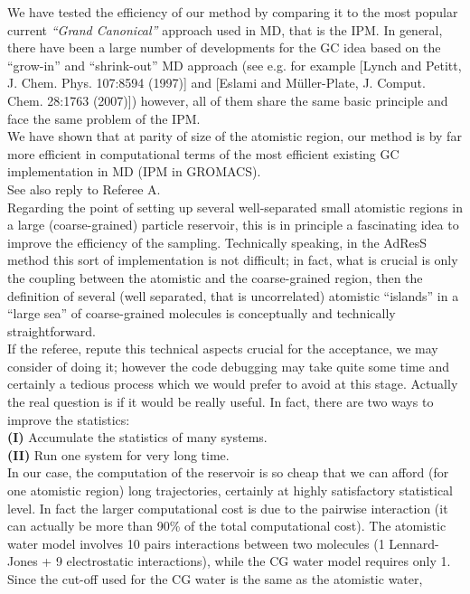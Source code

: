 \documentclass[12pt,a4paper]{article}
\begin{document}
We have tested the efficiency of our method by comparing it to the most popular current {\it ``Grand Canonical''} approach used in MD, that is the {IPM}.
In general, there have been a large number of developments for the GC idea based on the ``grow-in'' and ``shrink-out'' MD approach (see e.g. for example [Lynch and Petitt, J. Chem. Phys. 107:8594 (1997)] and [Eslami and M\"uller-Plate,
  J. Comput. Chem. 28:1763 (2007)]) however, all of them  share the same basic principle and face the same problem
  of the IPM.
\\
We have shown that at parity of size of the atomistic region, our method is by far more efficient in computational terms of the most efficient existing GC implementation in MD (IPM in GROMACS).\\
See also reply to Referee A.\\
Regarding the point of setting up several  well-separated small atomistic regions in a large (coarse-grained) particle reservoir, this is in principle
  a fascinating idea to improve the efficiency of the sampling. Technically speaking, in the AdResS method this sort of implementation is not difficult;
in fact, what is crucial is only the coupling between the atomistic and the coarse-grained region, then the definition of several (well separated, that is uncorrelated)
atomistic ``islands'' in a ``large sea'' of coarse-grained molecules is conceptually and technically straightforward.\\
If the referee, repute this technical aspects crucial for the acceptance, we may consider of doing it; however the code debugging may take quite some time and certainly a tedious process which we would prefer to avoid at this stage.
Actually the real question is if it would be really useful.
In fact, there are two ways to improve the statistics:\\
{\bf (I)} Accumulate the statistics of many systems.\\
{\bf (II)} Run one system for very long time.\\
In our case, the computation of the reservoir is so cheap that we can afford (for one atomistic region) long trajectories, certainly at highly satisfactory statistical level. In fact the
  larger computational cost is due to the pairwise interaction (it can actually be more than 90\% of the total computational cost).
  The atomistic water model involves 10 pairs interactions between two molecules (1 Lennard-Jones + 9 electrostatic interactions),
  while the CG water model requires only 1. Since the cut-off used for the CG water is the same as the atomistic water,
\end{document}
